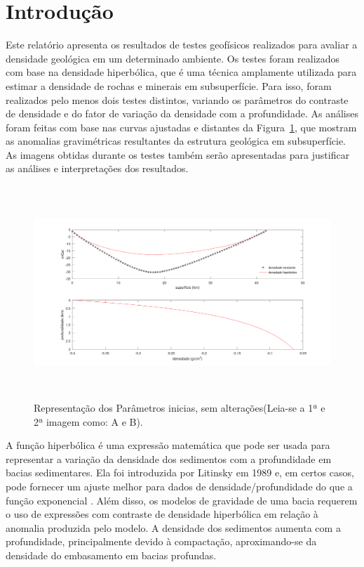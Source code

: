 \section{Introdução}

Este relatório apresenta os resultados de testes geofísicos realizados para avaliar a densidade geológica em um determinado ambiente. Os testes foram realizados com base na densidade hiperbólica, que é uma técnica amplamente utilizada para estimar a densidade de rochas e minerais em subsuperfície. Para isso, foram realizados pelo menos dois testes distintos, variando os parâmetros do contraste de densidade e do fator de variação da densidade com a profundidade. As análises foram feitas com base nas curvas ajustadas e distantes da Figura~\ref{Figura 1}, que mostram as anomalias gravimétricas resultantes da estrutura geológica em subsuperfície. As imagens obtidas durante os testes também serão apresentadas para justificar as análises e interpretações dos resultados.

        \begin{figure}[!h]  
        \centering
        \includegraphics[height=8cm]{figure/Imagem inicial.png}
        \caption{Representação dos Parâmetros inicias, sem alterações(Leia-se a 1ª e 2ª imagem como: A e B).}
        \label{Figura 1}
        \end{figure}
        
A função hiperbólica é uma expressão matemática que pode ser usada para representar a variação da densidade dos sedimentos com a profundidade em bacias sedimentares. Ela foi introduzida por Litinsky em 1989 e, em certos casos, pode fornecer um ajuste melhor para dados de densidade/profundidade do que a função exponencial \cite{sari2002analysis}. Além disso, os modelos de gravidade de uma bacia requerem o uso de expressões com contraste de densidade hiperbólica em relação à anomalia produzida pelo modelo. A densidade dos sedimentos aumenta com a profundidade, principalmente devido à compactação, aproximando-se da densidade do embasamento em bacias profundas.

